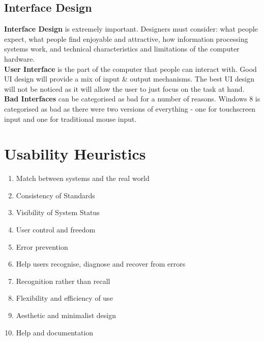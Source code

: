 \documentclass[a4paper,11pt]{article}
\begin{document}
\subsection{Interface Design}
\textbf{Interface Design} is extremely important. Designers must consider: what people expect, what people find enjoyable and attractive, how information processing systems work, and technical characteristics and limitations of the computer hardware.\\
\textbf{User Interface} is the part of the computer that people can interact with. Good UI design will provide a mix of input \& output mechanisms. The best UI design will not be noticed as it will allow the user to just focus on the task at hand.\\
\textbf{Bad Interfaces} can be categorised as bad for a number of reasons. Windows 8 is categorised as bad as there were two versions of everything - one for touchscreen input and one for traditional mouse input.

\section{Usability Heuristics}
\begin{enumerate}
    \item Match between systems and the real world
    \item Consistency of Standards
    \item Visibility of System Status
    \item User control and freedom
    \item Error prevention
    \item Help users recognise, diagnose and recover from errors
    \item Recognition rather than recall
    \item Flexibility and efficiency of use
    \item Aesthetic and minimalist design
    \item Help and documentation
\end{enumerate}
\end{document}
